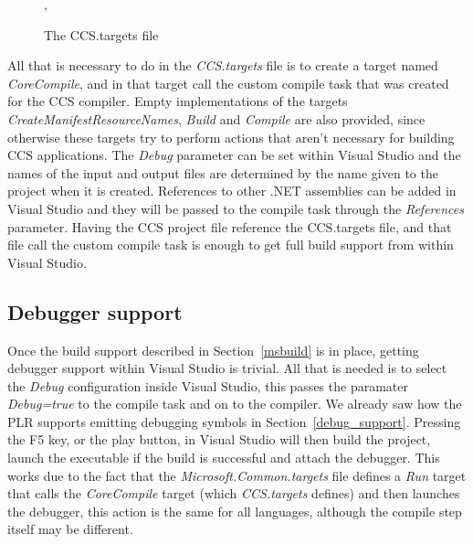 	\begin{figure}
\caption{The CCS.targets file}
\label{fig:ccstargets},
\end{figure}
	
	All that is necessary to do in the \textit{CCS.targets} file is to create a 
	target named \textit{CoreCompile}, and in that target call the custom 
	compile task that was created for the CCS compiler. Empty implementations of 
	the targets \textit{CreateManifestResourceNames}, \textit{Build} and 
	\textit{Compile} are also provided, since otherwise these targets try to 
	perform actions that aren't necessary for building CCS applications. The 
	\textit{Debug} parameter can be set within Visual Studio and the names of 
	the input and output files are determined by the name given to the project 
	when it is created. References to other .NET assemblies can be added in 
	Visual Studio and they will be passed to the compile task through the 
	\textit{References} parameter. Having the CCS project file reference the 
	CCS.targets file, and that file call the custom compile task is enough to 
	get full build support from within Visual Studio.
	
	\subsection{Debugger support}
	
	Once the build support described in Section~\ref{msbuild} is in place, 
	getting debugger support within Visual Studio is trivial. All that is needed 
	is to select the \textit{Debug} configuration inside Visual Studio, this 
	passes the paramater \textit{Debug=true} to the compile task and on to the 
	compiler. We already saw how the PLR supports emitting debugging symbols in 
	Section~\ref{debug_support}. Pressing the F5 key, or the play button, in 
	Visual Studio will then build the project, launch the executable if the 
	build is successful and attach the debugger. This works due to the fact that 
	the \textit{Microsoft.Common.targets} file defines a \textit{Run} target 
	that calls the \textit{CoreCompile} target (which \textit{CCS.targets} 
	defines) and then launches the debugger, this action is the same for all 
	languages, although the compile step itself may be different.
	
